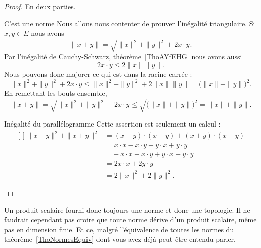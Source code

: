 \begin{proof}
    En deux parties.
    \begin{subproof}
        \item[C'est une norme]
            Nous allons nous contenter de prouver l'inégalité triangulaire. Si \( x,y\in E\) nous avons
            \begin{equation}
                \| x+y \|=\sqrt{\| x \|^2+\| y \|^2+2x\cdot y}.
            \end{equation}
            Par l'inégalité de Cauchy-Schwarz, théorème~\ref{ThoAYfEHG} nous avons aussi
            \begin{equation}
                2x\cdot y\leq 2\| x \|\| y \|.
            \end{equation}
            Nous pouvons donc majorer ce qui est dans la racine carrée :
            \begin{equation}
                \| x \|^2+\| y \|^2+2x\cdot y\leq \| x \|^2+\| y \|^2+2\| x \|\| y \|=\big( \| x \|+\| y \| \big)^2.
            \end{equation}
            En remettant les bouts ensemble,
            \begin{equation}
                \| x+y \|  =\sqrt{\| x \|^2+\| y \|^2+2x\cdot y}  \leq \sqrt{\big( \| x \|+\| y \| \big)^2}=\| x \|+\| y \|.
            \end{equation}

        \item[Inégalité du parallélogramme]
            Cette assertion est seulement un calcul :
            \begin{equation}
                \begin{aligned}[]
                    \| x-y \|^2+\| x+y \|^2&=(x-y)\cdot (x-y)+(x+y)\cdot(x+y)\\
                    &=x\cdot x-x\cdot y-y\cdot x+y\cdot y\\
                    &\quad +x\cdot x+x\cdot y+y\cdot x+y\cdot y\\
                    &=2x\cdot x+2y\cdot y\\
                    &=2\| x \|^2+2\| y \|^2.
                \end{aligned}
            \end{equation}
    \end{subproof}
\end{proof}

\begin{normaltext}
    Un produit scalaire fourni donc toujours une norme et donc une topologie. Il ne faudrait cependant pas croire que toute norme dérive d'un produit scalaire, même pas en dimension finie. Et ce, malgré l'équivalence de toutes les normes du théorème~\ref{ThoNormesEquiv} dont vous avez déjà peut-être entendu parler.
\end{normaltext}


